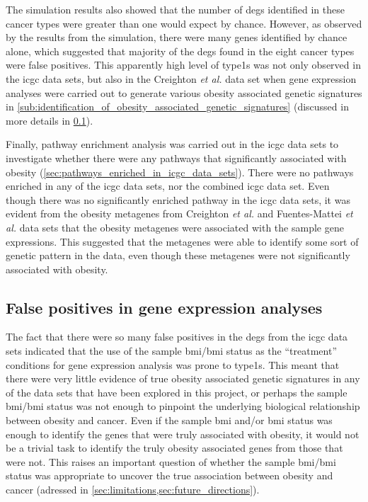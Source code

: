 The simulation results also showed that the number of \glspl{deg} identified in these cancer types were greater than one would expect by chance.
However, as observed by the results from the simulation, there were many genes identified by chance alone, which suggested that majority of the \glspl{deg} found in the eight cancer types were false positives.
This apparently high level of \Glspl{type1} was not only observed in the \gls{icgc} data sets, but also in the Creighton \textit{et al.} data set when gene expression analyses were carried out to generate various obesity associated genetic signatures in \cref{sub:identification_of_obesity_associated_genetic_signatures} (discussed in more details in \cref{sub:false_positives_in_gene_expression_analyses}).

Finally, pathway enrichment analysis was carried out in the \gls{icgc} data sets to investigate whether there were any pathways that significantly associated with obesity (\cref{sec:pathways_enriched_in_icgc_data_sets}).
There were no pathways enriched in any of the \gls{icgc} data sets, nor the combined \gls{icgc} data set.
Even though there was no significantly enriched  pathway in the \gls{icgc} data sets, it was evident from the obesity metagenes from Creighton \textit{et al.} and Fuentes-Mattei \textit{et al.} data sets that the obesity metagenes were associated with the sample gene expressions.
This suggested that the metagenes were able to identify some sort of genetic pattern in the data, even though these metagenes were not significantly associated with obesity.

\subsection{False positives in gene expression analyses}
\label{sub:false_positives_in_gene_expression_analyses}

The fact that there were so many false positives in the \glspl{deg} from the \gls{icgc} data sets indicated that the use of the sample \gls{bmi}/\gls{bmi} status as the ``treatment'' conditions for gene expression analysis was prone to \Glspl{type1}.
This meant that there were very little evidence of true obesity associated genetic signatures in any of the data sets that have been explored in this project, or perhaps the sample \gls{bmi}/\gls{bmi} status was not enough to pinpoint the underlying biological relationship between obesity and cancer.
Even if the sample \gls{bmi} and/or \gls{bmi} status was enough to identify the genes that were truly associated with obesity, it would not be a trivial task to identify the truly obesity associated genes from those that were not.
This raises an important question of whether the sample \gls{bmi}/\gls{bmi} status was appropriate to uncover the true association between obesity and cancer (adressed in \cref{sec:limitations,sec:future_directions}).


